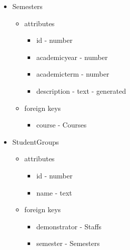 \begin{itemize}
	\item Semesters
	\begin{itemize}
		\item attributes
		\begin{itemize}
			\item id - number
			\item academicyear - number
			\item academicterm - number
			\item description - text - generated
		\end{itemize}
		\item foreign keys
		\begin{itemize}
			\item course - Courses
		\end{itemize}
	\end{itemize}
	
	\item StudentGroups
	\begin{itemize}
		\item attributes
		\begin{itemize}
			\item id - number
			\item name - text
		\end{itemize}
		\item foreign keys
		\begin{itemize}
			\item demonstrator - Staffs
			\item semester - Semesters
		\end{itemize}
	\end{itemize}
	

\end{itemize}
